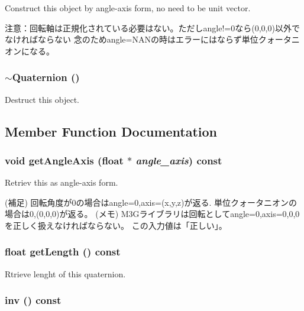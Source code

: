 Construct this object by angle-axis form, no need to be unit vector.

注意：回転軸は正規化されている必要はない。ただしangle!=0なら(0,0,0)以外でなければならない 念のためangle=NANの時はエラーにはならず単位クォータニオンになる。 \hypertarget{classm3g_1_1Quaternion_6e9a147677b9ffd583c59e9d06c3d938}{
\subsubsection[{$\sim$Quaternion}]{\setlength{\rightskip}{0pt plus 5cm}$\sim${\bf Quaternion} ()}}
\label{classm3g_1_1Quaternion_6e9a147677b9ffd583c59e9d06c3d938}


Destruct this object. 

\subsection{Member Function Documentation}
\hypertarget{classm3g_1_1Quaternion_3049675269aef6bb333d8f83fdf6eed7}{
\subsubsection[{getAngleAxis}]{\setlength{\rightskip}{0pt plus 5cm}void getAngleAxis (float $\ast$ {\em angle\_\-axis}) const}}
\label{classm3g_1_1Quaternion_3049675269aef6bb333d8f83fdf6eed7}


Retriev this as angle-axis form.

(補足) 回転角度が0の場合はangle=0,axis=(x,y,z)が返る. 単位クォータニオンの場合は0,(0,0,0)が返る。 (メモ) M3Gライブラリは回転としてangle=0,axis=0,0,0を正しく扱えなければならない。 この入力値は「正しい」。 \hypertarget{classm3g_1_1Quaternion_b4393f1928cea2a3baadbf9acdd99de2}{
\subsubsection[{getLength}]{\setlength{\rightskip}{0pt plus 5cm}float getLength () const}}
\label{classm3g_1_1Quaternion_b4393f1928cea2a3baadbf9acdd99de2}


Rtrieve lenght of this quaternion. \hypertarget{classm3g_1_1Quaternion_c544c21c80182fc0a7f2c9dbe5f42a0a}{
\subsubsection[{inv}]{ inv () const}}
\label{classm3g_1_1Quaternion_c544c21c80182fc0a7f2c9dbe5f42a0a}


